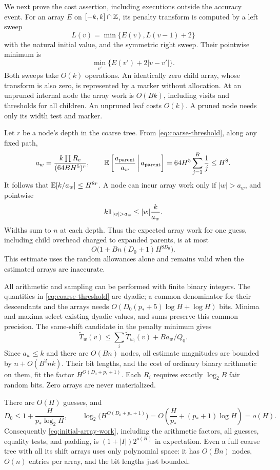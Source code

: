 We next prove the cost assertion, including executions outside the accuracy
event.  For an array $E$ on $[-k,k]\cap\mathbb Z$, its penalty transform is computed
by a left sweep
\[
 L(v)=\min\{E(v),L(v-1)+2\}
\]
with the natural initial value, and the symmetric right sweep.  Their
pointwise minimum is
\[
 \min_{v'}\{E(v')+2|v-v'|\}.
\]
Both sweeps take $O(k)$ operations.  An identically zero child array, whose transform is also zero,
is represented by a marker without allocation.  At an unpruned internal
node the array work is $O(Bk)$, including visits and thresholds for all
children.  An unpruned leaf costs $O(k)$.  A pruned node needs only its width
test and marker.

Let $r$ be a node's depth in the coarse tree.  From
\eqref{eq:coarse-threshold}, along any fixed path,
\[
 a_w=\frac{k\prod R_e}{(64BH^5)^r},\qquad
 \mathbb E\left[\frac{a_{\mathrm{parent}}}{a_w}\,\middle|\,
          a_{\mathrm{parent}}\right]
 =64H^5\sum_{j=1}^B\frac1j\le H^8.
\]
It follows that $\mathbb E[k/a_w]\le H^{8r}$.  A node can incur array work only if
$|w|>a_w$, and pointwise
\[
 k\ind_{|w|>a_w}\le |w|\frac{k}{a_w}.
\]
Widths sum to $n$ at each depth.  Thus the expected array work for one guess,
including child overhead charged to expanded parents, is at most
\begin{equation}\label{eq:initial-array-work}
 O\bigl(1+Bn(D_0+1)H^{8D_0}\bigr).
\end{equation}
This estimate uses the random allowances alone and remains valid when the
estimated arrays are inaccurate.

All arithmetic and sampling can be performed with finite binary integers.
The quantities in \eqref{eq:coarse-threshold} are dyadic; a common denominator
for their descendants and the arrays needs
$O(D_0(p_*+5)\log H+\log H)$ bits.  Minima and maxima select existing dyadic
values, and sums preserve this common precision.  The same-shift candidate
in the penalty minimum gives
\[
 \widetilde T_w(v)\le\sum_i\widetilde T_{w_i}(v)+Ba_w/Q_0.
\]
Since $a_w\le k$ and there are $O(Bn)$ nodes, all estimate magnitudes are
bounded by $n+O(B^2nk)$.  Their bit lengths, and the cost of ordinary binary
arithmetic on them, fit the factor $H^{O(D_0+p_*+1)}$.  Each $R_i$ requires
exactly $\log_2B$ fair random bits.  Zero arrays are never materialized.

There are $O(H)$ guesses, and
\[
 D_0\le1+\frac{H}{p_*\log_2H},\qquad
 \log_2\bigl(H^{O(D_0+p_*+1)}\bigr)
 =O\left(\frac H{p_*}+(p_*+1)\log H\right)=o(H).
\]
Consequently \eqref{eq:initial-array-work}, including the arithmetic factors,
all guesses, equality tests, and padding, is $(1+|I|)2^{o(H)}$ in expectation.
Even a full coarse tree with all its shift arrays uses only polynomial
space: it has $O(Bn)$ nodes, $O(n)$ entries per array, and the bit lengths
just bounded.

